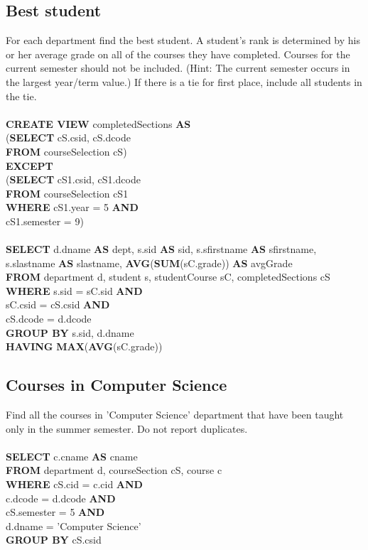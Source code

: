 \documentclass[11pt]{article}
\begin{document}
\subsection{Best student}
For each department find the best student. A student’s rank is determined by his or her average grade on all of the courses they have completed. Courses for the current semester should not be included. (Hint: The current semester occurs in the largest year/term value.) If there is a tie for first place, include all students in the tie.\\
~\\
\textbf{CREATE VIEW} completedSections \textbf{AS}\\
(\textbf{SELECT} cS.csid, cS.dcode\\
\textbf{FROM} courseSelection cS)\\
\textbf{EXCEPT}\\
(\textbf{SELECT} cS1.csid, cS1.dcode\\
\textbf{FROM} courseSelection cS1\\
\textbf{WHERE} cS1.year = 5 \textbf{AND}\\
cS1.semester = 9)\\
~\\
\textbf{SELECT} d.dname \textbf{AS} dept, s.sid \textbf{AS} sid, s.sfirstname \textbf{AS} sfirstname,\\ s.slastname \textbf{AS} slastname, \textbf{AVG}(\textbf{SUM}(sC.grade)) \textbf{AS} avgGrade \\
\textbf{FROM} department d, student s, studentCourse sC, completedSections cS\\
\textbf{WHERE} s.sid = sC.sid \textbf{AND}\\
sC.csid = cS.csid \textbf{AND}\\
cS.dcode = d.dcode\\
\textbf{GROUP BY} s.sid, d.dname\\
\textbf{HAVING} \textbf{MAX}(\textbf{AVG}(sC.grade))\\

\subsection{Courses in Computer Science}
Find all the courses in 'Computer Science' department that have been taught only in the summer semester. Do not report duplicates.\\
~\\
\textbf{SELECT} c.cname \textbf{AS} cname\\
\textbf{FROM} department d, courseSection cS, course c\\
\textbf{WHERE} cS.cid = c.cid \textbf{AND}\\
c.dcode = d.dcode \textbf{AND}\\
cS.semester = 5 \textbf{AND}\\
d.dname = 'Computer Science'\\
\textbf{GROUP BY} cS.csid
\end{document}
